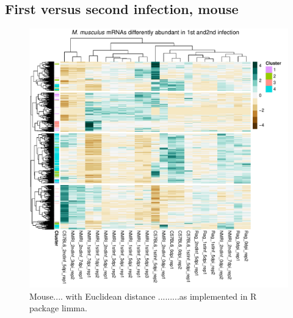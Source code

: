 \documentclass{article}
\begin{document}
\subsection{First versus second infection, mouse}
\begin{figure}[H]
\begin{center}
\includegraphics[width=\textwidth]{Mm1st2ndHeatmap.pdf}  
	\caption{Mouse.... with Euclidean distance .........as implemented in R package limma.}
\end{center}
\end{figure}
\end{document}

